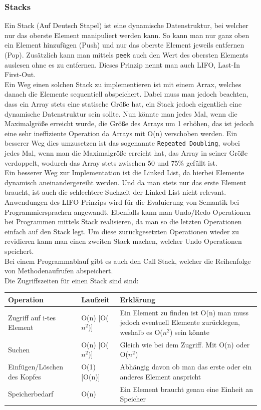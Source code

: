 \documentclass{article}
\begin{document}
	\subsubsection{Stacks}
	Ein Stack (Auf Deutsch Stapel) ist eine dynamische Datenstruktur, bei welcher nur das oberste Element manipuliert werden kann. So kann man nur ganz oben ein Element hinzufügen (Push) und nur das oberste Element jeweils entfernen (Pop). Zusätzlich kann man mittels \texttt{peek} auch den Wert des obersten Elements auslesen ohne es zu entfernen. Dieses Prinzip nennt man auch LIFO, Last-In First-Out. \\
	Ein Weg einen solchen Stack zu implementieren ist mit einem Arrax, welches danach die Elemente sequentiell abspeichert. Dabei muss man jedoch beachten, dass ein Array stets eine statische Größe hat, ein Stack jedoch eigentlich eine dynamische Datenstruktur sein sollte. Nun könnte man jedes Mal, wenn die Maximalgröße erreicht wurde, die Größe des Arrays um 1 erhöhen, das ist jedoch eine sehr ineffiziente Operation da Arrays mit O(n) verschoben werden. Ein besserer Weg dies umzusetzen ist das sogenannte \texttt{Repeated Doubling}, wobei jedes Mal, wenn man die Maximalgröße erreicht hat, das Array in seiner Größe verdoppelt, wodurch das Array stets zwischen 50 und 75\% gefüllt ist. \\
	Ein besserer Weg zur Implementation ist die Linked List, da hierbei Elemente dynamisch aneinandergereiht werden. Und da man stets nur das erste Element braucht, ist auch die schlechtere Suchzeit der Linked List nicht relevant. \\
	Anwendungen des LIFO Prinzips wird für die Evaluierung von Semantik bei Programmiersprachen angewandt. Ebenfalls kann man Undo/Redo Operationen bei Programmen mittels Stack realisieren, da man so die letzten Operationen einfach auf den Stack legt. Um diese zurückgesetzten Operationen wieder zu revidieren kann man einen zweiten Stack machen, welcher Undo Operationen speichert. \\
	Bei einem Programmablauf gibt es auch den Call Stack, welcher die Reihenfolge von Methodenaufrufen abspeichert. \\
	Die Zugriffszeiten für einen Stack sind sind: \\
	\begin{tabular}{| l | l | l |}
		\toprule
		Operation & Laufzeit & Erklärung \\ \midrule
		Zugriff auf i-tes Element & O(n) [O($n^2$)] & \makecell[l]{Ein Element zu finden ist O(n) man muss jedoch eventuell Elemente \\ zurücklegen,  weshalb es O($n^2$) sein könnte} \\ \hline
		Suchen & O(n) [O($n^2$)] & Gleich wie bei dem Zugriff. Mit O(n) oder O($n^2$) \\ \hline
		Einfügen/Löschen des Kopfes & O(1) [O(n)] & Abhängig davon ob man das erste oder ein anderes Element anspricht \\ \hline
		Speicherbedarf & O(n) & Ein Element braucht genau eine Einheit an Speicher \\
		\bottomrule
	\end{tabular} \\
\end{document}
